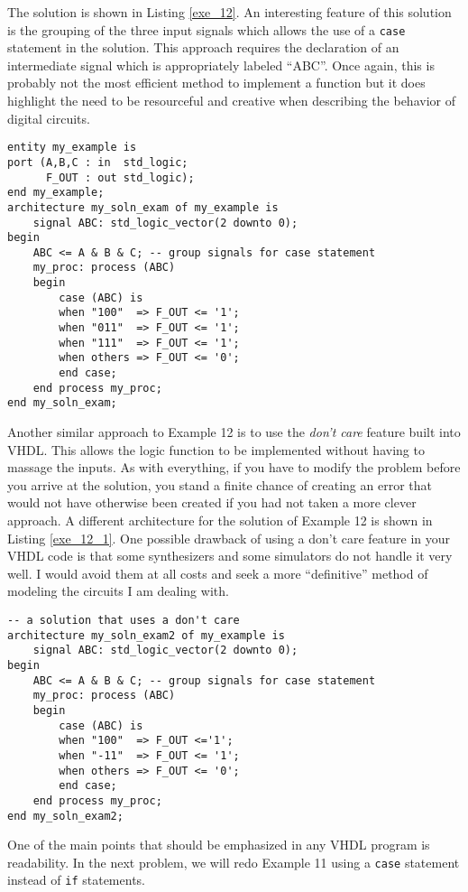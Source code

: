 The solution is shown in Listing \ref{exe_12}. An interesting feature of this solution is the grouping of the three input signals which allows the use of a \texttt{case} statement in the solution. This approach requires the declaration of an intermediate signal which is appropriately labeled ``ABC''. Once again, this is probably not the most efficient method to implement a function but it does highlight the need to be resourceful and creative when describing the behavior of digital circuits.
\begin{lstlisting}[label=exe_12, caption=Solution to Example 12.]
entity my_example is
port (A,B,C : in  std_logic;
      F_OUT : out std_logic);
end my_example;
architecture my_soln_exam of my_example is
	signal ABC: std_logic_vector(2 downto 0);
begin
	ABC <= A & B & C; -- group signals for case statement
	my_proc: process (ABC)
	begin
		case (ABC) is
		when "100"  => F_OUT <= '1';
		when "011"  => F_OUT <= '1';
		when "111"  => F_OUT <= '1';
		when others => F_OUT <= '0';
		end case;
	end process my_proc;
end my_soln_exam;
\end{lstlisting}
Another similar approach to Example 12 is to use the \textit{don't care} feature built into VHDL. This allows the logic function to be implemented without having to massage the inputs. As with everything, if you have to modify the problem before you arrive at the solution, you stand a finite chance of creating an error that would not have otherwise been created if you had not taken a more clever approach. A different architecture for the solution of Example 12 is shown in Listing \ref{exe_12_1}. One possible drawback of using a don't care feature in your VHDL code is that some synthesizers and some simulators do not handle it very well. I would avoid them at all costs and seek a more ``definitive'' method of modeling the circuits I am dealing with.
\null\newpage
\begin{lstlisting}[label=exe_12_1, caption=Alternative solution to Example 12.]
-- a solution that uses a don't care
architecture my_soln_exam2 of my_example is
	signal ABC: std_logic_vector(2 downto 0);
begin
	ABC <= A & B & C; -- group signals for case statement
	my_proc: process (ABC)
	begin
		case (ABC) is
		when "100"  => F_OUT <='1';
		when "-11"  => F_OUT <= '1';
		when others => F_OUT <= '0';
		end case;
	end process my_proc;
end my_soln_exam2;
\end{lstlisting}
One of the main points that should be emphasized in any VHDL program is readability. In the next problem, we will redo Example 11 using a \texttt{case} statement instead of \texttt{if} statements.

